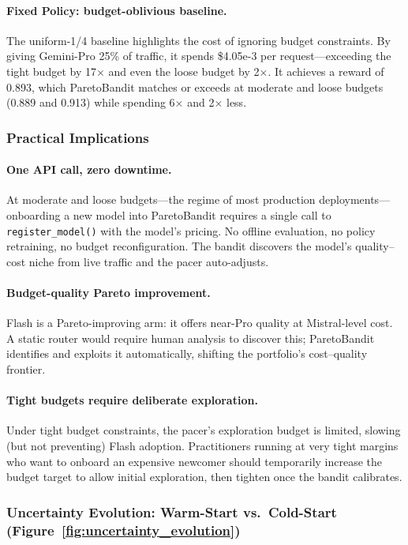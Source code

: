 \paragraph{Fixed Policy: budget-oblivious baseline.}
The uniform-1/4 baseline highlights the cost of ignoring budget
constraints.
By giving Gemini-Pro 25\% of traffic, it spends \$4.05e-3 per
request---exceeding the tight budget by 17$\times$ and even the
loose budget by 2$\times$.
It achieves a reward of 0.893, which ParetoBandit matches or exceeds
at moderate and loose budgets (0.889 and 0.913) while spending
6$\times$ and 2$\times$ less.

\subsubsection{Practical Implications}

\paragraph{One API call, zero downtime.}
At moderate and loose budgets---the regime of most production
deployments---onboarding a new model into ParetoBandit requires a
single call to \texttt{register\_model()} with the model's pricing.
No offline evaluation, no policy retraining, no budget
reconfiguration.  The bandit discovers the model's quality--cost
niche from live traffic and the pacer auto-adjusts.

\paragraph{Budget-quality Pareto improvement.}
Flash is a Pareto-improving arm: it offers near-Pro quality at
Mistral-level cost.  A static router would require human analysis
to discover this; ParetoBandit identifies and exploits it
automatically, shifting the portfolio's cost--quality frontier.

\paragraph{Tight budgets require deliberate exploration.}
Under tight budget constraints, the pacer's exploration budget is
limited, slowing (but not preventing) Flash adoption.
Practitioners running at very tight margins who want to onboard an
expensive newcomer should temporarily increase the budget target to
allow initial exploration, then tighten once the bandit calibrates.

\subsubsection{Uncertainty Evolution: Warm-Start vs.\ Cold-Start (Figure~\ref{fig:uncertainty_evolution})}

